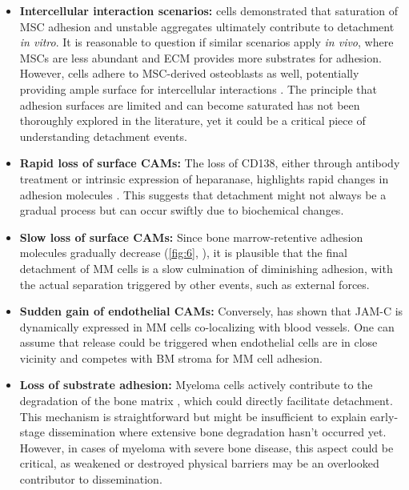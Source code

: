 \begin{itemize}

      \item\textbf{Intercellular interaction scenarios:} \INA cells demonstrated
            that saturation of MSC adhesion and unstable aggregates ultimately
            contribute to detachment \textit{in vitro}. It is reasonable to
            question if similar scenarios apply \textit{in vivo}, where MSCs are
            less abundant and ECM provides more substrates for adhesion.
            However, \INA cells adhere to MSC-derived osteoblasts as well,
            potentially providing ample surface for intercellular interactions
            \cite{dotterweichContactMyelomaCells2016}. The principle that
            adhesion surfaces are limited and can become saturated has not been
            thoroughly explored in the literature, yet it could be a critical
            piece of understanding detachment events.

      \item\textbf{Rapid loss of surface \acp{CAM}:} The loss of CD138, either
            through antibody treatment or intrinsic expression of heparanase,
            highlights rapid changes in adhesion molecules
            \cite{yangHeparanasePromotesSpontaneous2005,
                  akhmetzyanovaDynamicCD138Surface2020}. This suggests that detachment
            might not always be a gradual process but can occur swiftly due to
            biochemical changes.

      \item\textbf{Slow loss of surface \acp{CAM}:} Since bone marrow-retentive
            adhesion molecules gradually decrease (\autoref{fig:6},
            ), it is plausible that the final detachment of MM
            cells is a slow culmination of diminishing adhesion, with the actual
            separation triggered by other events, such as external forces.

      \item\textbf{Sudden gain of endothelial \acp{CAM}:} Conversely,
            \citet{brandlJunctionalAdhesionMolecule2022} has shown that JAM-C is
            dynamically expressed in MM cells co-localizing with blood vessels.
            One can assume that release could be triggered when endothelial
            cells are in close vicinity and competes with \ac{BM} stroma for MM
            cell adhesion.


      \item\textbf{Loss of substrate adhesion:} Myeloma cells actively
            contribute to the degradation of the bone matrix
            \cite{terposPathogenesisBoneDisease2018}, which could directly
            facilitate detachment. This mechanism is straightforward but might
            be insufficient to explain early-stage dissemination where extensive
            bone degradation hasn't occurred yet. However, in cases of myeloma with
            severe bone disease, this aspect could be critical, as weakened
            or destroyed physical barriers may be an overlooked contributor to
            dissemination.


\end{itemize}
